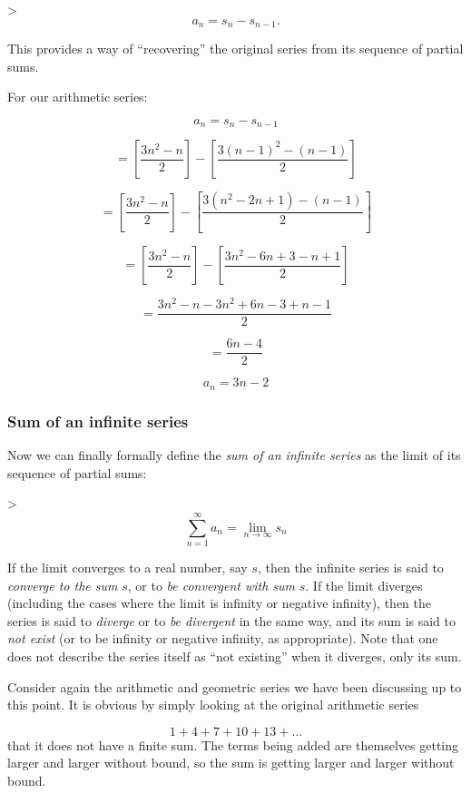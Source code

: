 > \[
a_n=s_n-s _{n-1}.
\]


This provides a way of ``recovering'' the original series from its sequence of partial sums.


For our arithmetic series:


\[
a_n = s_n-s _{n-1}
\]

\[
=\left[\frac{3n^2-n}{2}\right]-\left[\frac{3(n-1)^2-(n-1)}{2}\right]
\]

\[
=\left[\frac{3n^2-n}{2}\right]-\left[\frac{3(n^2-2n+1)-(n-1)}{2}\right]
\]

\[
=\left[\frac{3n^2-n}{2}\right]-\left[\frac{3n^2-6n+3-n+1}{2}\right]
\]

\[
=\frac{3n^2-n-3n^2+6n-3+n-1}{2}
\]

\[
=\frac{6n-4}{2}
\]

\[
a_n=3n-2
\]


\subsubsection{Sum of an infinite series}
\label{sss:sumo-5512}


Now we can finally formally define the \textit{sum of an infinite series} as the limit of its sequence of partial sums:


> \[
\sum _{n=1}^{\infty} a_n=\lim _{n\to\infty}s_n
\]


If the limit converges to a real number, say $s$, then the infinite series is said to \textit{converge to the sum} $s$, or to \textit{be convergent with sum} $s$. If the limit diverges (including the cases where the limit is infinity or negative infinity), then the series is said to \textit{diverge} or to \textit{be divergent} in the same way, and its sum is said to \textit{not exist} (or to be infinity or negative infinity, as appropriate). Note that one does not describe the series itself as ``not existing'' when it diverges, only its sum.


Consider again the arithmetic and geometric series we have been discussing up to this point. It is obvious by simply looking at the original arithmetic series


\[
1+4+7+10+13+\dots
\] that it does not have a finite sum. The terms being added are themselves getting larger and larger without bound, so the sum is getting larger and larger without bound.


